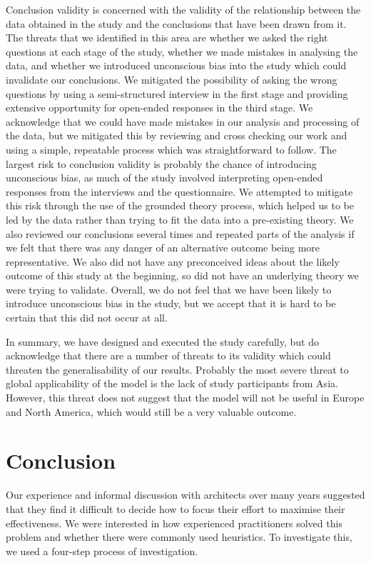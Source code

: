 Conclusion validity is concerned with the validity of the relationship between the data obtained in the study and the conclusions that have been drawn from it.  The threats that we identified in this area are whether we asked the right questions at each stage of the study, whether we made mistakes in analysing the data, and whether we introduced unconscious bias into the study which could invalidate our conclusions.  We mitigated the possibility of asking the wrong questions by using a semi-structured interview in the first stage and providing extensive opportunity for open-ended responses in the third stage.  We acknowledge that we could have made mistakes in our analysis and processing of the data, but we mitigated this by reviewing and cross checking our work and using a simple, repeatable process which was straightforward to follow.  The largest risk to conclusion validity is probably the chance of introducing unconscious bias, as much of the study involved interpreting open-ended responses from the interviews and the questionnaire.  We attempted to mitigate this risk through the use of the grounded theory process, which helped us to be led by the data rather than trying to fit the data into a pre-existing theory.  We also reviewed our conclusions several times and repeated parts of the analysis if we felt that there was any danger of an alternative outcome being more representative.  We also did not have any preconceived ideas about the likely outcome of this study at the beginning, so did not have an underlying theory we were trying to validate.  Overall, we do not feel that we have been likely to introduce unconscious bias in the study, but we accept that it is hard to be certain that this did not occur at all.

In summary, we have designed and executed the study carefully, but do acknowledge that there are a number of threats to its validity which could threaten the generalisability of our results.  Probably the most severe threat to global applicability of the model is the lack of study participants from Asia.  However, this threat does not suggest that the model will not be useful in Europe and North America, which would still be a very valuable outcome.

\section{Conclusion}

Our experience and informal discussion with architects over many years suggested that they find it difficult to decide how to focus their effort to maximise their effectiveness.  We were interested in how experienced practitioners solved this problem and whether there were commonly used heuristics.  To investigate this, we used a four-step process of investigation.

